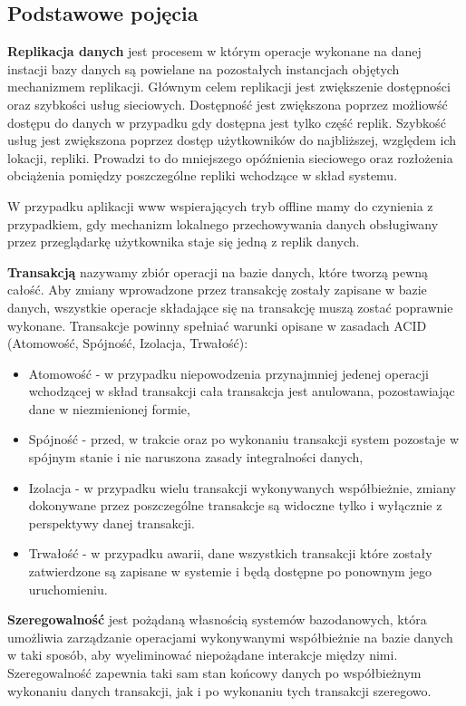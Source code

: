 \subsection{Podstawowe pojęcia}
\label{sec:podstPojecia}

\textbf{Replikacja danych} jest procesem w którym operacje wykonane na danej instacji bazy danych są powielane na pozostałych instancjach objętych mechanizmem replikacji. Głównym celem replikacji jest zwiększenie dostępności oraz szybkości usług sieciowych. Dostępność jest zwiększona poprzez możliowść dostępu do danych w przypadku gdy dostępna jest tylko część replik. Szybkość usług jest zwiększona poprzez dostęp użytkowników do najbliższej, względem ich lokacji, repliki. Prowadzi to do mniejszego opóźnienia sieciowego oraz rozłożenia obciążenia pomiędzy poszczególne repliki wchodzące w skład systemu.

W przypadku aplikacji www wspierających tryb offline mamy do czynienia z przypadkiem, gdy mechanizm lokalnego przechowywania danych obsługiwany przez przeglądarkę użytkownika staje się jedną z replik danych.

\textbf{Transakcją} nazywamy zbiór operacji na bazie danych, które tworzą pewną całość. Aby zmiany wprowadzone przez transakcję zostały zapisane w bazie danych, wszystkie operacje składające się na transakcję muszą zostać poprawnie wykonane. Transakcje powinny spełniać warunki opisane w zasadach ACID (Atomowość, Spójność, Izolacja, Trwałość):

\begin{itemize}
\item Atomowość - w przypadku niepowodzenia przynajmniej jedenej operacji wchodzącej w skład transakcji cała transakcja jest anulowana, pozostawiając dane w niezmienionej formie,
\item Spójność - przed, w trakcie oraz po wykonaniu transakcji system pozostaje w spójnym stanie i nie naruszona zasady integralności danych,
\item Izolacja - w przypadku wielu transakcji wykonywanych współbieżnie, zmiany dokonywane przez poszczególne transakcje są widoczne tylko i wyłącznie z perspektywy danej transakcji.
\item Trwałość - w przypadku awarii, dane wszystkich transakcji które zostały zatwierdzone są zapisane w systemie i będą dostępne po ponownym jego uruchomieniu.
\end{itemize}

\textbf{Szeregowalność} jest pożądaną własnością systemów bazodanowych, która umożliwia zarządzanie operacjami wykonywanymi współbieżnie na bazie danych w taki sposób, aby wyeliminować niepożądane interakcje między nimi. Szeregowalność zapewnia taki sam stan końcowy danych po współbieżnym wykonaniu danych transakcji, jak i po wykonaniu tych transakcji szeregowo.

